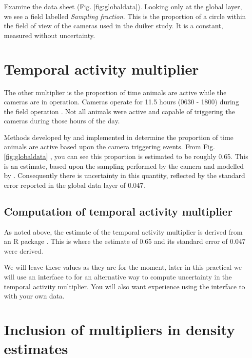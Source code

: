 \documentclass[a4paper, 10pt]{article}
\begin{document}
Examine the data sheet (Fig. \ref{fig:globaldata}).  Looking only at the global layer, we see a field labelled \emph{Sampling fraction}. This is the proportion of a circle within the field of view of the cameras used in the duiker study.  It is a constant, measured without uncertainty.

\section{Temporal activity multiplier}

The other multiplier is the proportion of time animals are active while the cameras are in operation.  Cameras operate for 11.5 hours (0630 - 1800) during the field operation \citep{howeetal}.  Not all animals were active and capable of triggering the cameras during those hours of the day.

Methods developed by \citet{rowcliffe_2014} and implemented in \citet{activity_pkg} determine the proportion of time animals are active based upon the camera triggering events.  From Fig. \ref{fig:globaldata} , you can see this proportion is estimated to be roughly 0.65.  This is an estimate, based upon the sampling performed by the camera and modelled by \citet{activity_pkg}.  Consequently there is uncertainty in this quantity, reflected by the standard error reported in the global data layer of 0.047.

\subsection{Computation of temporal activity multiplier}

As noted above, the estimate of the temporal activity multiplier is derived from an R package \citet{activity_pkg}.  This is where the estimate of 0.65 and its standard error of 0.047 were derived.  

We will leave these values as they are for the moment, later in this practical we will use an interface to \citet{activity_pkg} for an alternative way to compute uncertainty in the temporal activity multiplier.  You will also want experience using the interface to \citet{activity_pkg} with your own data.


\section{Inclusion of multipliers in density estimates}
\end{document}
